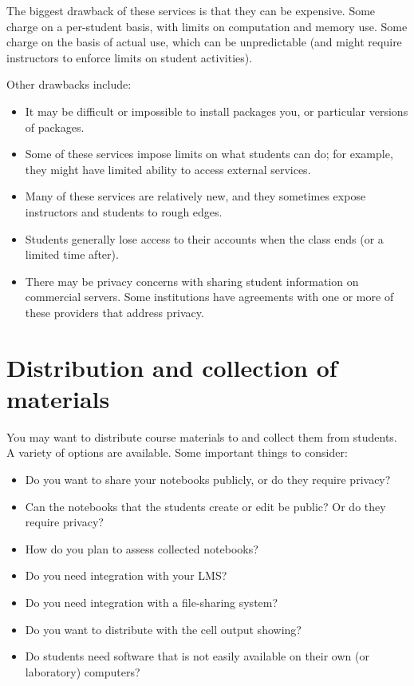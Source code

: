 \documentclass[]{book}
\begin{document}
The biggest drawback of these services is that they can be expensive.
Some charge on a per-student basis, with limits on computation and
memory use. Some charge on the basis of actual use, which can be
unpredictable (and might require instructors to enforce limits on
student activities).

Other drawbacks include:

\begin{itemize}
\item
  It may be difficult or impossible to install packages you, or
  particular versions of packages.
\item
  Some of these services impose limits on what students can do; for
  example, they might have limited ability to access external services.
\item
  Many of these services are relatively new, and they sometimes expose
  instructors and students to rough edges.
\item
  Students generally lose access to their accounts when the class ends
  (or a limited time after).
\item
  There may be privacy concerns with sharing student information on
  commercial servers. Some institutions have agreements with one or more
  of these providers that address privacy.
\end{itemize}

\section{Distribution and collection of
materials}\label{distribution-and-collection-of-materials}

You may want to distribute course materials to and collect them from
students. A variety of options are available. Some important things to
consider:

\begin{itemize}
\item
  Do you want to share your notebooks publicly, or do they require
  privacy?
\item
  Can the notebooks that the students create or edit be public? Or do
  they require privacy?
\item
  How do you plan to assess collected notebooks?
\item
  Do you need integration with your LMS?
\item
  Do you need integration with a file-sharing system?
\item
  Do you want to distribute with the cell output showing?
\item
  Do students need software that is not easily available on their own
  (or laboratory) computers?
\end{itemize}
\end{document}
